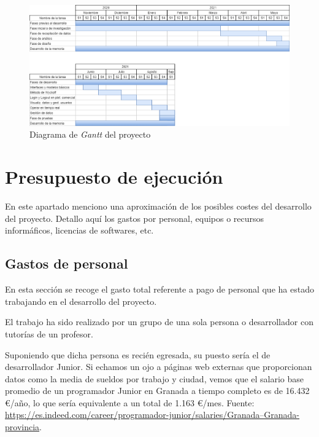 \begin{figure}
	\centering
	\includegraphics[width=\textwidth]{imagenes/gantt.png}
	\caption{Diagrama de \textit{Gantt} del proyecto} \label{diagrama_gantt}
\end{figure}



\section{Presupuesto de ejecución}

En este apartado menciono una aproximación de los posibles costes del desarrollo del proyecto. Detallo aquí los gastos por personal, equipos o recursos informáficos, licencias de softwares, etc.\newline

\subsection{Gastos de personal}

En esta sección se recoge el gasto total referente a pago de personal que ha estado trabajando en el desarrollo del proyecto. \newline

El trabajo ha sido realizado por un grupo de una sola persona o desarrollador con tutorías de un profesor. \newline

Suponiendo que dicha persona es recién egresada, su puesto sería el de desarrollador Junior. Si echamos un ojo a páginas web externas que proporcionan datos como la media de sueldos por trabajo y ciudad, vemos que el salario base promedio de un programador Junior en Granada a tiempo completo es de 16.432 \euro/año, lo que sería equivalente a un total de 1.163 \euro/mes. Fuente: \color{blue}\href{https://es.indeed.com/career/programador-junior/salaries/Granada--Granada-provincia}{https://es.indeed.com/career/programador-junior/salaries/Granada--Granada-provincia}\color{black}.\newline

